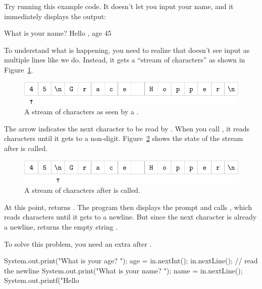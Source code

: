 Try running this example code.
It doesn't let you input your name, and it immediately displays the output:

\begin{stdout}
What is your name? Hello , age 45
\end{stdout}

To understand what is happening, you need to realize that  doesn't see input as multiple lines like we do.
Instead, it gets a ``stream of characters'' as shown in Figure~\ref{fig.hopper1}.

\begin{figure}[!ht]
\begin{center}
\includegraphics{figs/hopper1.pdf}
\caption{A stream of characters as seen by a .}
\label{fig.hopper1}
\end{center}
\end{figure}


The arrow indicates the next character to be read by .
When you call , it reads characters until it gets to a non-digit.
Figure~\ref{fig.hopper2} shows the state of the stream after  is called.

\begin{figure}[!ht]
\begin{center}
\includegraphics{figs/hopper2.pdf}
\caption{A stream of characters after  is called.}
\label{fig.hopper2}
\end{center}
\end{figure}

At this point,  returns .
The program then displays the prompt  and calls , which reads characters until it gets to a newline.
But since the next character is already a newline,  returns the empty string .

To solve this problem, you need an extra  after .

\begin{code}
System.out.print("What is your age? ");
age = in.nextInt();
in.nextLine();  // read the newline
System.out.print("What is your name? ");
name = in.nextLine();
System.out.printf("Hello %
\end{code}

